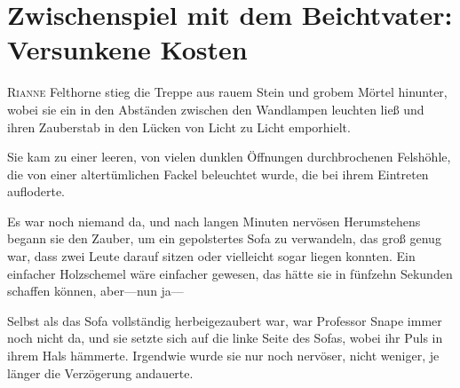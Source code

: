 \chapter{Zwischenspiel mit dem Beichtvater: Versunkene Kosten}

\lettrine{R}{ianne} Felthorne stieg die Treppe aus rauem Stein und grobem Mörtel hinunter, wobei sie ein  in den Abständen zwischen den Wandlampen leuchten ließ und ihren Zauberstab in den Lücken von Licht zu Licht emporhielt.

Sie kam zu einer leeren, von vielen dunklen Öffnungen durchbrochenen Felshöhle, die von einer altertümlichen Fackel beleuchtet wurde, die bei ihrem Eintreten aufloderte.

Es war noch niemand da, und nach langen Minuten nervösen Herumstehens begann sie den Zauber, um ein gepolstertes Sofa zu verwandeln, das groß genug war, dass zwei Leute darauf sitzen oder vielleicht sogar liegen konnten. Ein einfacher Holzschemel wäre einfacher gewesen, das hätte sie in fünfzehn Sekunden schaffen können, aber—nun ja—

Selbst als das Sofa vollständig herbeigezaubert war, war Professor Snape immer noch nicht da, und sie setzte sich auf die linke Seite des Sofas, wobei ihr Puls in ihrem Hals hämmerte. Irgendwie wurde sie nur noch nervöser, nicht weniger, je länger die Verzögerung andauerte.

